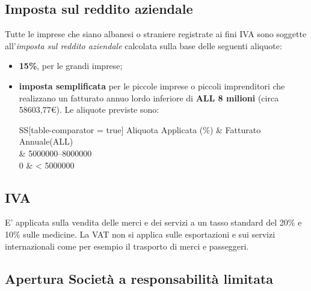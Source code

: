 \subsection{Imposta sul reddito aziendale} 
Tutte le imprese che siano albanesi o straniere registrate ai fini \ac{IVA} sono soggette all'\textit{imposta sul reddito aziendale} calcolata sulla base delle seguenti aliquote:
\begin{itemize}
	\item \textbf{15\%}, per le grandi imprese;
	\item \textbf{imposta semplificata} per le piccole imprese o piccoli imprenditori che realizzano un fatturato annuo lordo inferiore di \textbf{ALL 8 milioni} (circa 58603,77\euro). Le aliquote previste sono:
		\begin{center}
 			\begin{tabular}{SS[table-comparator = true]}
 			\toprule 
 				{Aliquota Applicata (\%)} & {Fatturato Annuale(ALL)} \\
 			 & \numrange{5000000}{8000000} \\
 				0 & < 5000000 \\
 			\bottomrule
 			\end{tabular} 
		\end{center}
\end{itemize} 
\subsection{IVA}
E' applicata sulla vendita delle merci e dei servizi a un tasso standard del 20\% e 10\% sulle medicine. La VAT non si applica sulle
esportazioni e sui servizi internazionali come per esempio il trasporto di merci e passeggeri.
\subsection[Apertura Società a responsabilità limitata]{Apertura Società a responsabilità limitata}

